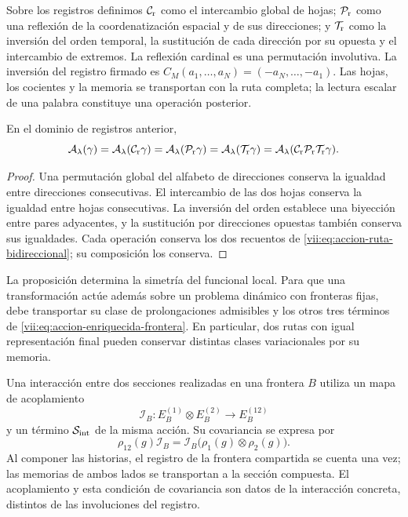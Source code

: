 Sobre los registros definimos \(\mathcal C_{\rm r}\) como el intercambio
global de hojas; \(\mathcal P_{\rm r}\) como una reflexión de la coordenatización
espacial y de sus direcciones; y \(\mathcal T_{\rm r}\) como la inversión
del orden temporal, la sustitución de cada dirección por su opuesta y el
intercambio de extremos. La reflexión cardinal es una permutación involutiva.
La inversión del registro firmado es
\(C_M(a_1,\ldots,a_N)=(-a_N,\ldots,-a_1)\).
Las hojas, los cocientes y la memoria se transportan con la ruta completa;
la lectura escalar de una palabra constituye una operación posterior.

\begin{proposition}
\label{vii:prop:invariancia-ruta-bidireccional}
En el dominio de registros anterior,
\[
 \mathcal A_\lambda(\gamma)
 =\mathcal A_\lambda(\mathcal C_{\rm r}\gamma)
 =\mathcal A_\lambda(\mathcal P_{\rm r}\gamma)
 =\mathcal A_\lambda(\mathcal T_{\rm r}\gamma)
 =\mathcal A_\lambda(\mathcal C_{\rm r}\mathcal P_{\rm r}
                              \mathcal T_{\rm r}\gamma).
\]
\end{proposition}
\begin{proof}
Una permutación global del alfabeto de direcciones conserva la igualdad
entre direcciones consecutivas. El intercambio de las dos hojas conserva
la igualdad entre hojas consecutivas. La inversión del orden establece una
biyección entre pares adyacentes, y la sustitución por direcciones opuestas
también conserva sus igualdades. Cada operación conserva los dos recuentos
de \eqref{vii:eq:accion-ruta-bidireccional}; su composición los conserva.
\end{proof}

La proposición determina la simetría del funcional local. Para que una
transformación actúe además sobre un problema dinámico con fronteras fijas,
debe transportar su clase de prolongaciones admisibles y los otros tres
términos de \eqref{vii:eq:accion-enriquecida-frontera}. En particular, dos
rutas con igual representación final pueden conservar distintas clases
variacionales por su memoria.

Una interacción entre dos secciones realizadas en una frontera \(B\)
utiliza un mapa de acoplamiento
\[
 \mathcal I_B:E_B^{(1)}\otimes E_B^{(2)}\longrightarrow E_B^{(12)}
\]
y un término \(\mathcal S_{\rm int}\) de la misma acción. Su covariancia
se expresa por
\[
 \rho_{12}(g)\mathcal I_B
 =\mathcal I_B\bigl(\rho_1(g)\otimes\rho_2(g)\bigr).
\]
Al componer las historias, el registro de la frontera compartida se cuenta
una vez; las memorias de ambos lados se transportan a la sección compuesta.
El acoplamiento y esta condición de covariancia son datos de la interacción
concreta, distintos de las involuciones del registro.

